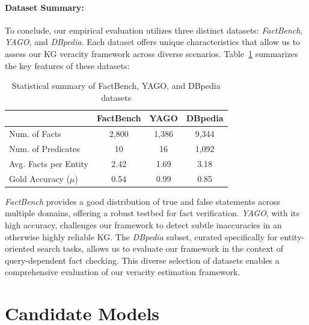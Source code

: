 \paragraph{Dataset Summary:}\label{par:summary}
To conclude, our empirical evaluation utilizes three distinct datasets: \textit{FactBench}, \textit{YAGO}, and \textit{DBpedia}.
Each dataset offers unique characteristics that allow us to assess our \ac{KG} veracity framework across diverse scenarios.
Table~\ref{tab:dataset-summary} summarizes the key features of these datasets:

\begin{table}[h!]
    \centering
    \caption{Statistical summary of FactBench, YAGO, and DBpedia datasets}
    \begin{tabular}{lccc}
        \toprule
        & \textbf{FactBench} & \textbf{YAGO} & \textbf{DBpedia} \\
        \midrule
        Num. of Facts & 2,800 & 1,386 & 9,344 \\
        Num. of Predicates & 10 & 16 & 1,092 \\
        Avg. Facts per Entity & 2.42 & 1.69 & 3.18 \\
        Gold Accuracy ($\mu$) & 0.54 & 0.99 & 0.85 \\
        \bottomrule
    \end{tabular}
    \label{tab:dataset-summary}
\end{table}

\textit{FactBench} provides a good distribution of true and false statements across multiple domains, offering a robust testbed for fact verification.
\textit{YAGO}, with its high accuracy, challenges our framework to detect subtle inaccuracies in an otherwise highly reliable \ac{KG}.
The \textit{DBpedia} subset, curated specifically for entity-oriented search tasks, allows us to evaluate our framework in the context of query-dependent fact checking.
This diverse selection of datasets enables a comprehensive evaluation of our veracity estimation framework.

\section{Candidate Models}\label{sec:empirical-evaluation:candidate-models}
